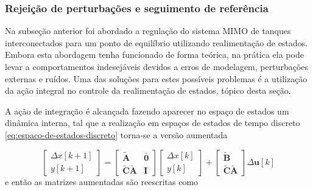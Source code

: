 \subsubsection{Rejeição de perturbações e seguimento de referência}
\label{subsub:rejeicao-de-perturbacoes-e-seguimento-de-referencia}

Na subseção anterior foi abordado a regulação do sistema MIMO de tanques
interconectados para um ponto de equilíbrio utilizando realimentação de estados.
Embora esta abordagem tenha funcionado de forma teórica, na prática ela pode
levar a comportamentos indesejáveis devidos a erros de modelagem, perturbações
externas e ruídos. Uma das soluções para estes possíveis problemas é a
utilização da ação integral no controle da realimentação de estados, tópico
desta seção.

A ação de integração é alcançada fazendo aparecer no espaço de estados um
dinâmica interna, tal que a realização em espaços de estados de tempo discreto
\ref{eq:espaco-de-estados-discreto} torna-se a versão aumentada

\begin{equation}
    \label{eq:espaco-de-estados-discreto-aumentado}
    \begin{bmatrix}
        \Delta x[k+1]\\ 
        y[k+1]
    \end{bmatrix}
    =
    \begin{bmatrix}
        \mathbf{\tilde{A}} & \mathbf{\bar{0}}\\ 
        \mathbf{\tilde{C}}\mathbf{\tilde{A}} & \mathbf{I}
    \end{bmatrix}
    \begin{bmatrix}
        \Delta x[k]\\ 
        y[k]
    \end{bmatrix}
    +
    \begin{bmatrix}
        \mathbf{\tilde{B}}\\ 
        \mathbf{\tilde{C}}\mathbf{\tilde{A}}
    \end{bmatrix}
    \Delta \mathbf{u}[k]
\end{equation} e então as matrizes aumentadas são reescritas como

